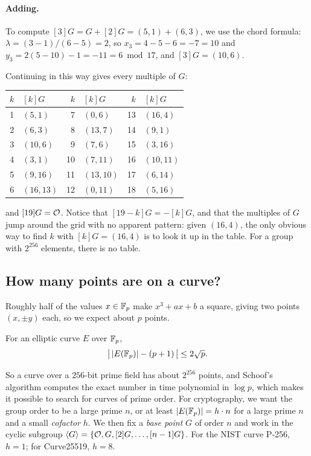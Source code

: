 \paragraph{Adding.}
To compute $[3]G = G + [2]G = (5, 1) + (6, 3)$, we use the chord formula:
$\lambda = (3 - 1)/(6 - 5) = 2$, so
$x_3 = 4 - 5 - 6 = -7 = 10$ and $y_3 = 2(5 - 10) - 1 = -11 = 6 \bmod 17$,
and $[3]G = (10, 6)$.

Continuing in this way gives every multiple of $G$:

\begin{center}
\small\setlength{\tabcolsep}{4pt}
\begin{tabular}{rl@{\qquad}rl@{\qquad}rl}
\hline
$k$ & $[k]G$ & $k$ & $[k]G$ & $k$ & $[k]G$ \\
\hline
1 & $(5,1)$   & 7  & $(0,6)$   & 13 & $(16,4)$ \\
2 & $(6,3)$   & 8  & $(13,7)$  & 14 & $(9,1)$ \\
3 & $(10,6)$  & 9  & $(7,6)$   & 15 & $(3,16)$ \\
4 & $(3,1)$   & 10 & $(7,11)$  & 16 & $(10,11)$ \\
5 & $(9,16)$  & 11 & $(13,10)$ & 17 & $(6,14)$ \\
6 & $(16,13)$ & 12 & $(0,11)$  & 18 & $(5,16)$ \\
\hline
\end{tabular}
\end{center}

\noindent and $[19]G = \mathcal{O}$.
Notice that $[19 - k]G = -[k]G$, and that the multiples of $G$ jump
around the grid with no apparent pattern: given $(16, 4)$, the only
obvious way to find $k$ with $[k]G = (16, 4)$ is to look it up in the
table. For a group with $2^{256}$ elements, there is no table.

\subsection{How many points are on a curve?}

Roughly half of the values $x \in \mathbb{F}_p$ make $x^3 + ax + b$ a square,
giving two points $(x, \pm y)$ each, so we expect about $p$ points.

\begin{theorem}[Hasse]
For an elliptic curve $E$ over $\mathbb{F}_p$,
\[ \big|\, |E(\mathbb{F}_p)| - (p + 1) \,\big| \le 2\sqrt{p}. \]
\end{theorem}

So a curve over a $256$-bit prime field has about $2^{256}$ points,
and Schoof's algorithm\autocite{Schoof85} computes the exact number in
time polynomial in $\log p$, which makes it possible to search for curves
of prime order.
For cryptography, we want the group order to be a large prime $n$, or
at least $|E(\mathbb{F}_p)| = h \cdot n$ for a large prime $n$ and a small
\emph{cofactor} $h$.
We then fix a \emph{base point} $G$ of order $n$ and work in the cyclic
subgroup $\langle G \rangle = \{\mathcal{O}, G, [2]G, \dots, [n-1]G\}$.
For the NIST curve P-256, $h = 1$; for Curve25519, $h = 8$.

